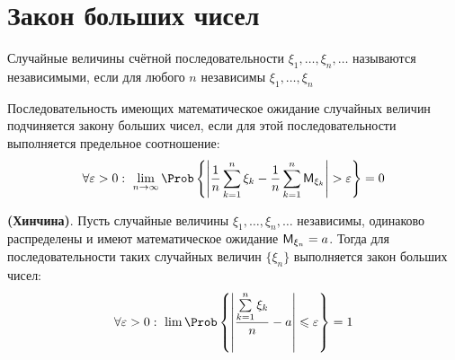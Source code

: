 \section{Закон больших чисел}
\begin{definition}
	Случайные величины счётной последовательности $\xi_1, \ldots, \xi_n, \ldots$ называются независимыми, если для любого $n$ независимы $\xi_1, \ldots, \xi_n$
\end{definition}
\begin{definition}
	Последовательность имеющих математическое ожидание случайных величин подчиняется закону больших чисел, если для этой последовательности выполняется предельное соотношение:
\[
	\forall \varepsilon > 0: \ \lim\limits_{n \to \infty} \Prob \left\{ \left| \frac{1}{n} \sum\limits_{k = 1}^{n} \xi_k - \frac{1}{n} \sum\limits_{k = 1}^{n} \MExpect_{\xi_k} \right| > \varepsilon \right\} = 0
\]
\end{definition}
\begin{theorem}
	\textbf{(Хинчина)}. Пусть случайные величины $\xi_1, \ldots, \xi_n, \ldots$ независимы, одинаково распределены и имеют математическое ожидание $ \mathsf{M}_{\xi_n} = a $. Тогда для последовательности таких случайных величин $\{ \xi_n \}$ выполняется закон больших чисел:
\[
	\forall \varepsilon > 0: \ \lim \Prob \left\{ \left| \frac{\sum\limits_{k = 1}^{n} \xi_k}{n} - a \right| \leqslant \varepsilon \right\} = 1 
\]
\end{theorem}
